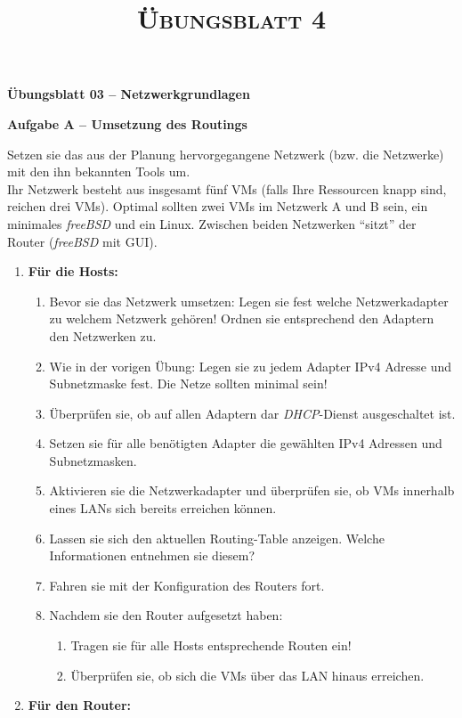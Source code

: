 \documentclass[paper=a4,fontsize=11pt]{scrartcl}%
\title{	
\normalfont \normalsize 
\textsc{Übungsblatt 4}
}
\begin{document}
\begin{center}
\Large{\textbf{Übungsblatt 03 -- Netzwerkgrundlagen}}
\end{center}
\begin{center}\Large{\textbf{Aufgabe A -- Umsetzung des Routings}}\end{center}\vskip0.25in
Setzen sie das aus der Planung hervorgegangene Netzwerk (bzw. die Netzwerke) mit den ihn bekannten Tools um.\\
Ihr Netzwerk besteht aus insgesamt fünf VMs (falls Ihre Ressourcen knapp sind, reichen drei VMs). Optimal sollten zwei VMs im Netzwerk A und B sein, ein minimales \emph{freeBSD} und ein Linux. Zwischen beiden Netzwerken \enquote{sitzt} der Router (\emph{freeBSD} mit GUI).
\begin{enumerate}
	\item \textbf{Für die Hosts:}\\
	\begin{enumerate}
		\item Bevor sie das Netzwerk umsetzen: Legen sie fest welche Netzwerkadapter zu welchem Netzwerk gehören! Ordnen sie entsprechend den Adaptern den Netzwerken zu.
		\item Wie in der vorigen Übung: Legen sie zu jedem Adapter IPv4 Adresse und Subnetzmaske fest. Die Netze sollten minimal sein!
		\item Überprüfen sie, ob auf allen Adaptern dar \emph{DHCP}-Dienst ausgeschaltet ist.
		\item Setzen sie für alle benötigten Adapter die gewählten IPv4 Adressen und Subnetzmasken.
		\item Aktivieren sie die Netzwerkadapter und überprüfen sie, ob VMs innerhalb eines LANs sich bereits erreichen können.
		\item Lassen sie sich den aktuellen Routing-Table anzeigen. Welche Informationen entnehmen sie diesem?
		\item Fahren sie mit der Konfiguration des Routers fort.
		\item Nachdem sie den Router aufgesetzt haben:
		\begin{enumerate}
			\item Tragen sie für alle Hosts entsprechende Routen ein!
			\item Überprüfen sie, ob sich die VMs über das LAN hinaus erreichen.
		\end{enumerate}
	\end{enumerate}
	\item \textbf{Für den Router:}\\

\end{enumerate}
\end{document}
